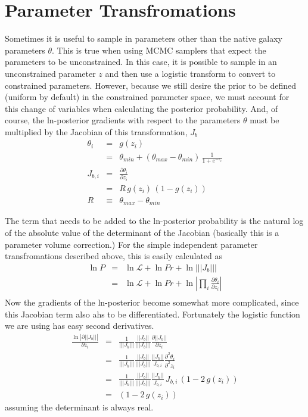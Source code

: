 \documentclass[modern]{aastex62}
\renewcommand{\det}[1]{||{#1}||}
\newcommand{\abs}[1]{|{#1}|}
\newcommand{\like}{\mathcal{L}}
\begin{document}
\section{Parameter Transfromations}
Sometimes it is useful to sample in parameters other than the native galaxy parameters $\theta$.
This is true when using MCMC samplers that expect the parameters to be unconstrained.
In this case, it is possible to sample in an unconstrained parameter $z$ and then use a logistic transform to convert to constrained parameters.
However, because we still desire the prior to be defined (uniform by default) in the constrained parameter space, we must account for this change of variables when calculating the posterior probability.
And, of course, the ln-posterior gradients with respect to the parameters $\theta$ must be multiplied by the Jacobian of this transformation, $J_b$
\begin{eqnarray}
  \theta_i & = & g(z_i) \\
         & = & \theta_{min} + (\theta_{max} - \theta_{min}) \, \frac{1}{1 + e^{-z_i}} \\
  J_{b,i} & = & \frac{\partial \theta_i}{\partial z_i} \\
           &  = &  R \, g(z_i) \, (1 - g(z_i)) \\
     R & \equiv & \theta_{max} - \theta_{min}
\end{eqnarray}

The term that needs to be added to the ln-posterior probability is the natural log of the absolute value of the determinant of the Jacobian
(basically this is a parameter volume correction.)
For the simple independent parameter transfromations described above, this is easily calculated as
\begin{eqnarray}
   \ln P   & = & \ln \like + \ln Pr + \ln\abs{\det{J_b}} \\
 & = & \ln \like + \ln Pr + \ln \abs{ \prod_i \frac{\partial \theta_i}{\partial z_i} } \\
 \end{eqnarray}
Now the gradients of the ln-posterior become somewhat more complicated, since this Jacobian term also ahs to be differentiated.
Fortunately the logistic function we are using has easy second derivatives.
\begin{eqnarray}
  \frac{\ln \abs{\partial \det{J_b}}}{\partial z_i} & = & \frac{1}{\abs{\det{J_b}}} \frac{\det{J_b}}{\abs{\det{J_b}}} \frac{\partial \det{J_b}}{\partial z_i} \\
   & = &  \frac{1}{\abs{\det{J_b}}} \frac{\det{J_b}}{\abs{\det{J_b}}}  \frac{\det{J_b}}{J_{b,i}} \frac{\partial^2\theta_i}{\partial^2 z_i} \\
   & = & \frac{1}{\abs{\det{J_b}}} \frac{\det{J_b}}{\abs{\det{J_b}}}  \frac{\det{J_b}}{J_{b,i}} \, J_{b,i} \, (1 - 2 \, g(z_i)) \\
   & = & (1 - 2 \, g(z_i))
\end{eqnarray}
assuming the determinant is always real.
\end{document}
